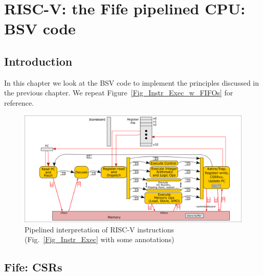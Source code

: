 

\chapter{RISC-V: the Fife pipelined CPU: BSV code}


\setcounter{page}{1}
\renewcommand{\thepage}{\arabic{chapter}-\arabic{page}}

\label{ch_Fife_Code}


\section{Introduction}

In this chapter we look at the BSV code to implement the principles
discussed in the previous chapter.  We repeat
Figure~\ref{Fig_Instr_Exec_w_FIFOs} for reference.

\begin{figure}[htbp]
  \centerline{\includegraphics[width=6in,angle=0]{Figures/Fig_Instr_Exec_w_FIFOs}}
  \caption{\label{Fig_Instr_Exec_w_FIFOs_2}Pipelined interpretation of RISC-V instructions (Fig.~\ref{Fig_Instr_Exec} with some annotations)}
\end{figure}


\section{Fife: CSRs}

